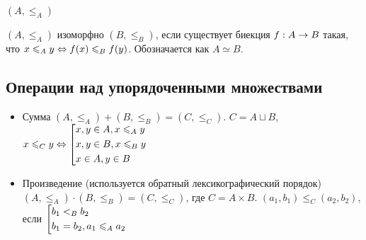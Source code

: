 \begin{example}
	$(A, \le_A)$
\end{example}

\begin{definition}
	$(A, \le_A)$ изоморфно $(B, \le_B)$, если существует биекция $f : A \rightarrow B$ такая, что $x \leqslant_A y \Leftrightarrow f(x) \leqslant_B f(y)$. Обозначается как $A \simeq B$.
\end{definition}

\subsection{Операции над упорядоченными множествами}

\begin{itemize}
	\item Сумма $(A, \le_A) + (B, \le_B) = (C, \le_C)$. $C = A \sqcup B$, $x \leqslant_C y \Leftrightarrow \left[\begin{aligned}&{x, y \in A, x \leqslant_A y} \\ &{x, y \in B, x \leqslant_B y} \\ &{x \in A, y \in B}\end{aligned}\right.$ %
	
	\item Произведение (используется обратный лексикографический порядок) $(A, \le_A) \cdot (B, \le_B) = (C, \le_C)$, где $C = A \times B$. $(a_1, b_1) \le_C (a_2, b_2)$, если $\left[\begin{aligned}&{b_1 <_B b_2} \\ &{b_1 = b_2, a_1 \leqslant_A a_2}\end{aligned}\right.$
\end{itemize}